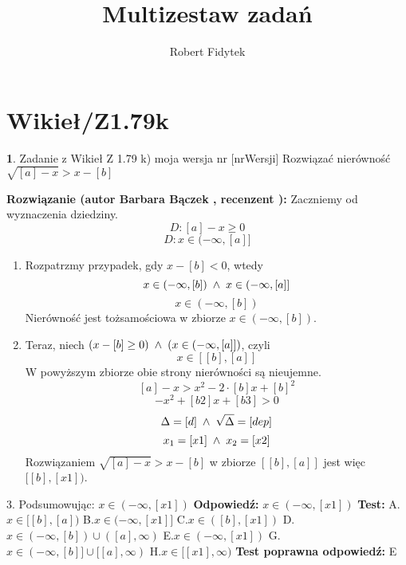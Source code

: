 \documentclass[12pt, a4paper]{article}
\title{Multizestaw zadań}
\author{Robert Fidytek}
\date{}
\theoremstyle{definition} %
\newtheorem{zad}{}
\newcommand{\kategoria}[1]{\section{#1}} %
\newcommand{\zadStart}[1]{\begin{zad}#1\newline} %
\newcommand{\zadStop}{\end{zad}}   %
\newcommand{\rozwStart}[2]{\noindent \textbf{Rozwiązanie (autor #1 , recenzent #2): }\newline} %
\newcommand{\rozwStop}{\newline}                                            %
\newcommand{\odpStart}{\noindent \textbf{Odpowiedź:}\newline}    %
\newcommand{\odpStop}{\newline}                                             %
\newcommand{\testStart}{\noindent \textbf{Test:}\newline} %
\newcommand{\testStop}{\newline} %
\newcommand{\kluczStart}{\noindent \textbf{Test poprawna odpowiedź:}\newline} %
\newcommand{\kluczStop}{\newline} %
\begin{document}
\maketitle


\kategoria{Wikieł/Z1.79k}
\zadStart{Zadanie z Wikieł Z 1.79 k) moja wersja nr [nrWersji]}
Rozwiązać nierówność $\sqrt{[a]-x}>x-[b]$
\zadStop
\rozwStart{Barbara Bączek}{}
Zaczniemy od wyznaczenia dziedziny.
$$D:[a]-x \geq 0 $$
$$D: x \in (-\infty, [a]]$$
\begin{enumerate}
\item Rozpatrzmy przypadek, gdy $x-[b]<0$, wtedy 
$$x \in (-\infty,[b]) \hspace{0.1 cm} \wedge \hspace{0.1 cm} x \in (-\infty, [a]]$$
$$x \in (-\infty,[b])$$
Nierówność jest tożsamościowa w zbiorze $ x \in (-\infty, [b])$.
\item Teraz, niech $(x-[b] \geq 0) \hspace{0.1 cm} \wedge \hspace{0.1 cm} (x \in (-\infty, [a]])$, czyli
$$x \in [[b], [a]]$$
W powyższym zbiorze obie strony nierówności są nieujemne.
$$[a]-x>x^2-2\cdot[b]x+{[b]}^2$$
$$-x^2 +[b2]x + [b3]>0$$
$$\Delta = [d] \hspace{0.1 cm} \wedge \hspace{0.1 cm} \sqrt{\Delta}=[dep]$$
$$x_1=[x1] \hspace{0.1 cm} \wedge \hspace{0.1cm}  x_2=[x2]$$
Rozwiązaniem $\sqrt{[a]-x}>x-[b]$ w zbiorze $[[b], [a]]$ jest więc $[[b], [x1])$.
\end{enumerate}
3. Podsumowując: $x \in (-\infty, [x1])$
\rozwStop
\odpStart
$x \in (-\infty, [x1])$
\odpStop
\testStart
A.$x \in [[b],[a])$
B.$x \in (-\infty, [x1]]$
C.$x \in ([b], [x1])$
D.$x \in (-\infty,[b]) \cup ([a], \infty)$
E.$x \in (-\infty, [x1])$
G.$x \in (-\infty,[b]] \cup [[a], \infty)$
H.$x \in [[x1], \infty)$
\testStop
\kluczStart
E
\kluczStop
\end{document}
